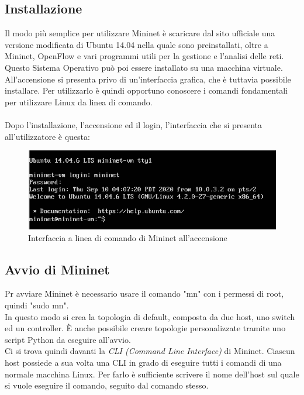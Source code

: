 \subsection{Installazione}\label{ch:2.1.1}
Il modo più semplice per utilizzare Mininet è scaricare dal sito ufficiale una versione modificata di Ubuntu 14.04 nella quale sono preinstallati, oltre a Mininet, OpenFlow e vari programmi utili per la gestione e l'analisi delle reti.\\
Questo Sistema Operativo può poi essere installato su una macchina virtuale. All'accensione si presenta privo di un'interfaccia grafica, che è tuttavia possibile installare. Per utilizzarlo è quindi opportuno conoscere i comandi fondamentali per utilizzare Linux da linea di comando.\\\\
Dopo l'installazione, l'accensione ed il login, l'interfaccia che si presenta all'utilizzatore è questa:
\begin{figure}[h!]
	\centering
	\includegraphics[width=1\linewidth]{../immagini/mn}
	\caption[Interfaccia di Mininet]{Interfaccia a linea di comando di Mininet all'accensione}
	\label{fig:mn}
\end{figure}
\subsection{Avvio di Mininet}\label{ch:2.1.2}
Pr avviare Mininet è necessario usare il comando "mn" con i permessi di root, quindi "sudo mn".\\
In questo modo si crea la topologia di default, composta da due host, uno switch ed un controller. È anche possibile creare topologie personalizzate tramite uno script Python da eseguire all'avvio.\\
Ci si trova quindi davanti la \textit{CLI (Command Line Interface)} di Mininet. Ciascun host possiede a sua volta una CLI in grado di eseguire tutti i comandi di una normale macchina Linux. Per farlo è sufficiente scrivere il nome dell'host sul quale si vuole eseguire il comando, seguito dal comando stesso.

